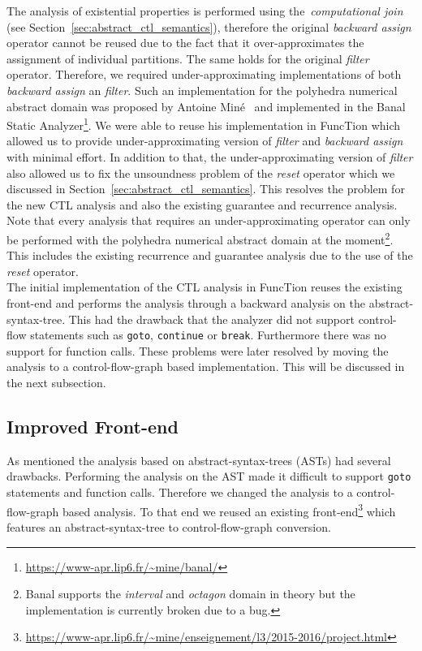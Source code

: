\documentclass[11pt,a4paper,titlepage]{article}
\theoremstyle{definition}
\begin{document}
The analysis of existential properties is performed using the~\textit{computational join} (see Section~\ref{sec:abstract_ctl_semantics}), 
therefore the original \textit{backward assign} operator cannot be reused due to the 
fact that it over-approximates the assignment of individual partitions. The same holds for the original \textit{filter} operator.
Therefore, we required under-approximating implementations of both \textit{backward assign} an \textit{filter}.
Such an implementation for the polyhedra numerical abstract domain was proposed by 
Antoine Miné~\cite{DBLP:journals/entcs/Mine12} and implemented in the Banal Static Analyzer\footnote{\url{https://www-apr.lip6.fr/~mine/banal/}}.
We were able to reuse his implementation in FuncTion which allowed us to provide under-approximating 
version of \textit{filter} and \textit{backward assign} with minimal effort. 
In addition to that, the under-approximating version of \textit{filter} also allowed us to fix the unsoundness problem of the
\textit{reset} operator which we discussed in Section~\ref{sec:abstract_ctl_semantics}. This resolves the problem for the 
new CTL analysis and also the existing guarantee and recurrence analysis. 
Note that every analysis that requires an under-approximating operator can only be 
performed with the polyhedra numerical abstract domain at the moment\footnote{Banal supports the 
    \textit{interval} and \textit{octagon} domain in theory but the implementation is currently broken due to a bug.}.
This includes the existing recurrence and guarantee analysis due to the use of the \textit{reset} operator.\\

The initial implementation of the CTL analysis in FuncTion reuses the existing front-end and performs the analysis through a backward analysis 
on the abstract-syntax-tree. This had the drawback that the analyzer did not support control-flow statements such as \texttt{goto}, \texttt{continue}
or \texttt{break}. Furthermore there was no support for function calls.
These problems were later resolved by moving the analysis to a control-flow-graph based implementation. 
This will be discussed in the next subsection. 

\subsection{Improved Front-end}
As mentioned the analysis based on abstract-syntax-trees (ASTs) had several drawbacks. Performing the analysis on the AST made it
difficult to support \texttt{goto} statements and function calls. Therefore we changed the analysis to a control-flow-graph based analysis.
To that end we reused an existing front-end\footnote{\url{https://www-apr.lip6.fr/~mine/enseignement/l3/2015-2016/project.html}}
which features an abstract-syntax-tree to control-flow-graph conversion.\\
\end{document}
